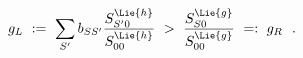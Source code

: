 \begin{equation}\label{app:inequality}
g_{L}\ :=\ \sum_{S'}b_{SS'}\frac{S^{\Lie{h}}_{S'0}}{S^{\Lie{h}}_{00}}\
> \ \frac{S^{\Lie{g}}_{S0}}{S^{\Lie{g}}_{00}}\ =:\ g_{R}\ \ .
\end{equation}

